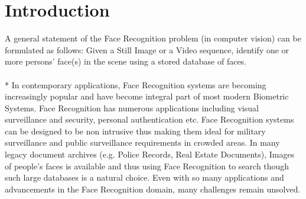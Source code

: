 \section{Introduction}

A general statement of the Face Recognition problem (in computer vision) can be formulated as follows: Given a Still Image or a Video sequence, identify one or more persons' face(s) in the scene using a stored database of faces.\\ 
\\*
In contemporary applications, Face Recognition systems are becoming increasingly popular and have become integral part of most modern Biometric Systems.  Face Recognition has   numerous applications   including   visual   surveillance   and   security, personal authentication etc. Face Recognition systems can be designed to be non intrusive thus making them ideal for military surveillance and public surveillance requirements in crowded areas. In many legacy document archives (e.g. Police Records, Real Estate Documents), Images of people's faces is available and thus using Face Recognition to search though such large databases is a natural choice. Even with so many applications and advancements in the Face Recognition domain, many challenges remain unsolved.
